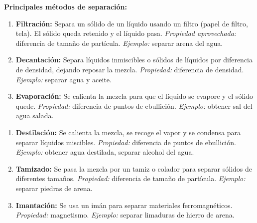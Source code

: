 \documentclass[12pt, letterpaper]{article}
\begin{document}
\begin{cuadroteoria}
  \textbf{Principales métodos de separación:}

  \begin{enumerate}[leftmargin=*, label=\arabic*.]
    \item \textbf{Filtración:} Separa un sólido de un líquido usando un filtro (papel de filtro, tela). El sólido queda retenido y el líquido pasa. \textit{Propiedad aprovechada:} diferencia de tamaño de partícula. \textit{Ejemplo:} separar arena del agua.

    \item \textbf{Decantación:} Separa líquidos inmiscibles o sólidos de líquidos por diferencia de densidad, dejando reposar la mezcla. \textit{Propiedad:} diferencia de densidad. \textit{Ejemplo:} separar agua y aceite.

    \item \textbf{Evaporación:} Se calienta la mezcla para que el líquido se evapore y el sólido quede. \textit{Propiedad:} diferencia de puntos de ebullición. \textit{Ejemplo:} obtener sal del agua salada.
  \end{enumerate}
\end{cuadroteoria}
\begin{cuadroteoria}
  \begin{enumerate}[start=4]
    \item \textbf{Destilación:} Se calienta la mezcla, se recoge el vapor y se condensa para separar líquidos miscibles. \textit{Propiedad:} diferencia de puntos de ebullición. \textit{Ejemplo:} obtener agua destilada, separar alcohol del agua.

    \item \textbf{Tamizado:} Se pasa la mezcla por un tamiz o colador para separar sólidos de diferentes tamaños. \textit{Propiedad:} diferencia de tamaño de partícula. \textit{Ejemplo:} separar piedras de arena.

    \item \textbf{Imantación:} Se usa un imán para separar materiales ferromagnéticos. \textit{Propiedad:} magnetismo. \textit{Ejemplo:} separar limaduras de hierro de arena.
  \end{enumerate}
\end{cuadroteoria}
\end{document}

